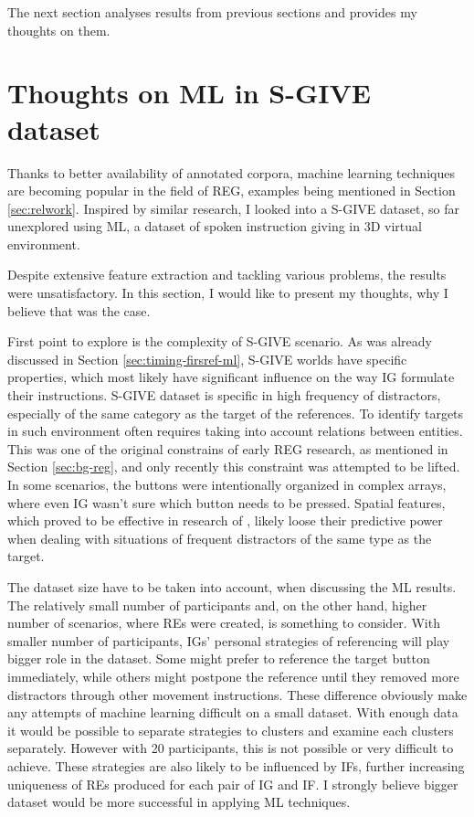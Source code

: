 The next section analyses results from previous sections and provides my thoughts on them.

\section{Thoughts on ML in S-GIVE dataset}
Thanks to better availability of annotated corpora, machine learning techniques are becoming popular in the field of REG, examples being mentioned in Section \ref{sec:relwork}. Inspired by similar research, I looked into a S-GIVE dataset, so far unexplored using ML, a dataset of spoken instruction giving in 3D virtual environment.

Despite extensive feature extraction and tackling various problems, the results were unsatisfactory. In this section, I would like to present my thoughts, why I believe that was the case.

First point to explore is the complexity of S-GIVE scenario. As was already discussed in Section \ref{sec:timing-firsref-ml}, S-GIVE worlds have specific properties, which most likely have significant influence on the way IG formulate their instructions. S-GIVE dataset is specific in high frequency of distractors, especially of the same category as the target of the references. To identify targets in such environment often requires taking into account relations between entities. This was one of the original constrains of early REG research, as mentioned in Section \ref{sec:bg-reg}, and only recently this constraint was attempted to be lifted. In some scenarios, the buttons were intentionally organized in complex arrays, where even IG wasn't sure which button needs to be pressed. Spatial features, which proved to be effective in research of \citet{stoia2006sentence}, likely loose their predictive power when dealing with situations of frequent distractors of the same type as the target.

The dataset size have to be taken into account, when discussing the ML results. The relatively small number of participants and, on the other hand, higher number of scenarios, where REs were created, is something to consider. With smaller number of participants, IGs' personal strategies of referencing will play bigger role in the dataset. Some might prefer to reference the target button immediately, while others might postpone the reference until they removed more distractors through other movement instructions. These difference obviously make any attempts of machine learning difficult on a small dataset. With enough data it would be possible to separate strategies to clusters and examine each clusters separately. However with 20 participants, this is not possible or very difficult to achieve. These strategies are also likely to be influenced by IFs, further increasing uniqueness of REs produced for each pair of IG and IF. I strongly believe bigger dataset would be more successful in applying ML techniques.

